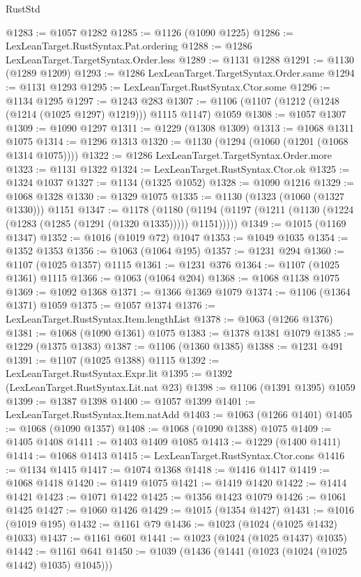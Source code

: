 \begin{lexlean}{RustStd}
\begin{coremodule}
@1283 := @1057 @1282
@1285 := @1126 (@1090 @1225)
@1286 := LexLeanTarget.RustSyntax.Pat.ordering
@1288 := @1286 LexLeanTarget.TargetSyntax.Order.less
@1289 := @1131 @1288
@1291 := @1130 (@1289 @1209)
@1293 := @1286 LexLeanTarget.TargetSyntax.Order.same
@1294 := @1131 @1293
@1295 := LexLeanTarget.RustSyntax.Ctor.some
@1296 := @1134 @1295
@1297 := @1243 @283
@1307 := @1106 (@1107 (@1212 (@1248 (@1214 (@1025 @1297) @1219))) @1115 @1147) @1059
@1308 := @1057 @1307
@1309 := @1090 @1297
@1311 := @1229 (@1308 @1309)
@1313 := @1068 @1311 @1075
@1314 := @1296 @1313
@1320 := @1130 (@1294 (@1060 (@1201 (@1068 @1314 @1075))))
@1322 := @1286 LexLeanTarget.TargetSyntax.Order.more
@1323 := @1131 @1322
@1324 := LexLeanTarget.RustSyntax.Ctor.ok
@1325 := @1324 @1037
@1327 := @1134 (@1325 @1052)
@1328 := @1090 @1216
@1329 := @1068 @1328
@1330 := @1329 @1075
@1335 := @1130 (@1323 (@1060 (@1327 @1330))) @1151
@1347 := @1178
    (@1180 (@1194 (@1197 (@1211 (@1130 (@1224 (@1283 (@1285 (@1291 (@1320 @1335))))) @1151)))))
@1349 := @1015 (@1169 @1347)
@1352 := @1016 (@1019 @72) @1047
@1353 := @1049 @1035
@1354 := @1352 @1353
@1356 := @1063 (@1064 @195)
@1357 := @1231 @294
@1360 := @1107 (@1025 @1357) @1115
@1361 := @1231 @376
@1364 := @1107 (@1025 @1361) @1115
@1366 := @1063 (@1064 @204)
@1368 := @1068 @1138 @1075
@1369 := @1092 @1368
@1371 := @1366 @1369 @1079
@1374 := @1106 (@1364 @1371) @1059
@1375 := @1057 @1374
@1376 := LexLeanTarget.RustSyntax.Item.lengthList
@1378 := @1063 (@1266 @1376)
@1381 := @1068 (@1090 @1361) @1075
@1383 := @1378 @1381 @1079
@1385 := @1229 (@1375 @1383)
@1387 := @1106 (@1360 @1385)
@1388 := @1231 @491
@1391 := @1107 (@1025 @1388) @1115
@1392 := LexLeanTarget.RustSyntax.Expr.lit
@1395 := @1392 (LexLeanTarget.RustSyntax.Lit.nat @23)
@1398 := @1106 (@1391 @1395) @1059
@1399 := @1387 @1398
@1400 := @1057 @1399
@1401 := LexLeanTarget.RustSyntax.Item.natAdd
@1403 := @1063 (@1266 @1401)
@1405 := @1068 (@1090 @1357)
@1408 := @1068 (@1090 @1388) @1075
@1409 := @1405 @1408
@1411 := @1403 @1409 @1085
@1413 := @1229 (@1400 @1411)
@1414 := @1068 @1413
@1415 := LexLeanTarget.RustSyntax.Ctor.cons
@1416 := @1134 @1415
@1417 := @1074 @1368
@1418 := @1416 @1417
@1419 := @1068 @1418
@1420 := @1419 @1075
@1421 := @1419 @1420
@1422 := @1414 @1421
@1423 := @1071 @1422
@1425 := @1356 @1423 @1079
@1426 := @1061 @1425
@1427 := @1060 @1426
@1429 := @1015 (@1354 @1427)
@1431 := @1016 (@1019 @195)
@1432 := @1161 @79
@1436 := @1023 (@1024 (@1025 @1432) @1033)
@1437 := @1161 @601
@1441 := @1023 (@1024 (@1025 @1437) @1035)
@1442 := @1161 @641
@1450 := @1039 (@1436 (@1441 (@1023 (@1024 (@1025 @1442) @1035) @1045)))

\end{coremodule}
\end{lexlean}
